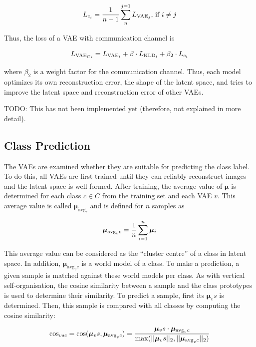 \begin{equation}\eqlbl{hso_9}
	L_{c_i} = \frac{1}{n-1} \sum_{n}^{j=1} L_{\text{VAE}_j} \text{, if } i \neq j
\end{equation}

Thus, the loss of a VAE with communication channel is

\begin{equation}\eqlbl{hso_10}
		L_{{\text{VAE}_C}_i} = L_{\text{VAE}_i} + \beta \cdot L_{\text{KLD}_i} + \beta_2 \cdot L_{c_i}
\end{equation}

where $\beta_2$ is a weight factor for the communication channel. Thus, each model optimizes its own reconstruction error, the shape of the latent space, and tries to improve the latent space and reconstruction error of other VAEs.


TODO: This has not been implemented yet (therefore, not explained in more detail).


\subsection{Class Prediction}
The VAEs are examined whether they are suitable for predicting the class label. To do this, all VAEs are first trained until they can reliably reconstruct images and the latent space is well formed.
After training, the average value of $\boldsymbol{\mu}$ is determined for each class $c \in C$ from the training set and each VAE $v$. This average value is called $\boldsymbol{\mu}_{\text{avg}_c}$ and is defined for $n$ samples as

\begin{equation}\eqlbl{hso_12}
		\boldsymbol{\mu}_{\text{avg}_vc} = \frac{1}{n} \sum_{i=1}^{n} \boldsymbol{\mu}_i
\end{equation}

This average value can be considered as the ``cluster centre'' of a class in latent space. In addition, $\boldsymbol{\mu}_{\text{avg}_vc}$ is a world model of a class. To make a prediction, a given sample is matched against these world models per class. As with vertical self-organisation, the cosine similarity between a sample and the class prototypes is used to determine their similarity. To predict a sample, first its $\boldsymbol{\mu}_vs$ is determined. Then, this sample is compared with all classes by computing the cosine similarity: 

\begin{equation}\eqlbl{hso_13}
		\text{cos}_{vsc} = \text{cos}(\boldsymbol{\mu}_vs, \boldsymbol{\mu}_{\text{avg}_vc}) = \frac{\boldsymbol{\mu}_vs \cdot \boldsymbol{\mu}_{\text{avg}_vc}}{\max(||\boldsymbol{\mu}_vs||_2, ||\boldsymbol{\mu}_{\text{avg}_vc}||_2)}
\end{equation}

